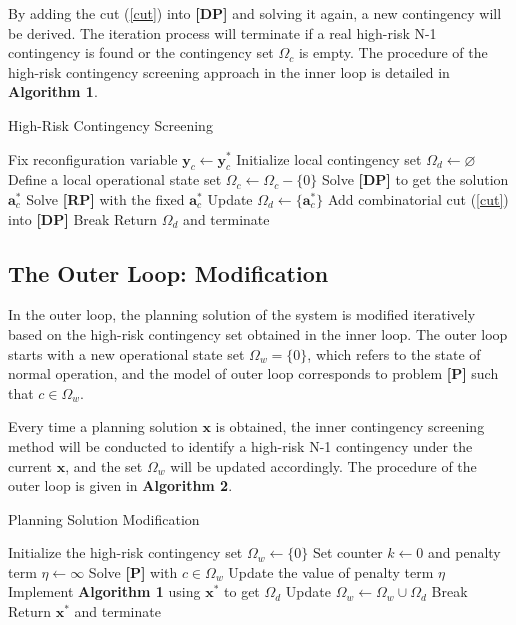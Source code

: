 \documentclass[a4paper,fleqn]{cas-dc}
\begin{document}
By adding the cut (\ref{cut}) into \textbf{[DP]} and solving it again, a new
contingency will be derived. The iteration process will terminate if a 
real high-risk N-1 contingency is found or the contingency set 
$ \Omega_{c} $ is empty. The procedure of the high-risk contingency 
screening approach in the inner loop is detailed in \textbf{Algorithm 1}.

\begin{algorithm}[!h]
    \caption{High-Risk Contingency Screening}
    Fix reconfiguration variable $ \boldsymbol{y}_{c} \leftarrow \boldsymbol{y}_{c}^{*} $\;
    Initialize local contingency set $ \Omega_{d} \leftarrow \varnothing $\;
    Define a local operational state set $ \Omega_{c} \leftarrow \Omega_{c} - \{0\} $\;
    {
        Solve \textbf{[DP]} to get the 
        solution $ \boldsymbol{a}_{c}^{*} $\;
        {
            Solve \textbf{[RP]} with the fixed $ \boldsymbol{a}_{c}^{*} $\;
            {
                Update $ \Omega_{d} \leftarrow \{\boldsymbol{a}_{c}^{*}\} $\;
            }
            {
                Add combinatorial cut (\ref{cut}) into \textbf{[DP]}\;
            }
        }
        {
            Break\;
        }
    }
    Return $ \Omega_{d} $ and terminate\;
\end{algorithm}

\subsection{The Outer Loop: Modification}

In the outer loop, the planning solution of the system is modified iteratively 
based on the high-risk contingency set obtained in the inner loop. The outer 
loop starts with a new operational state set $ \Omega_{w} = \{0\} $, which 
refers to the state of normal operation, and the model of outer loop
corresponds to problem \textbf{[P]} such that $ c \in \Omega_{w} $.

Every time a planning solution $ \boldsymbol{x} $ is obtained, the inner 
contingency screening method will be conducted to identify a high-risk 
N-1 contingency under the current $ \boldsymbol{x} $, and the set 
$ \Omega_{w} $ will be updated accordingly. The procedure of the outer loop
is given in \textbf{Algorithm 2}.

\begin{algorithm}[!h]
    \caption{Planning Solution Modification}
    Initialize the high-risk contingency set $ \Omega_{w} \leftarrow \{0\} $\;
    Set counter $ k \leftarrow 0 $ and penalty term $ \eta \leftarrow \infty $\;
    {
        Solve \textbf{[P]} with $ c \in \Omega_{w} $\;
        Update the value of penalty term $ \eta $\;
        Implement \textbf{Algorithm 1} using $ \boldsymbol{x}^{*} $ to get 
        $ \Omega_{d} $\;
        {
            Update $ \Omega_{w} \leftarrow \Omega_{w} \cup \Omega_{d}$\;
        }
        {
            Break\;
        }
    }
    Return $ \boldsymbol{x}^{*} $ and terminate\;
\end{algorithm}
\end{document}
